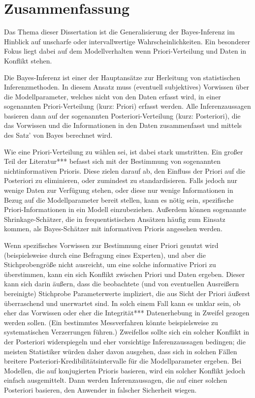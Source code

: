 \chapter*{Zusammenfassung}

Das Thema dieser Dissertation ist die Generalisierung der Bayes-Inferenz
im Hinblick auf unscharfe oder intervallwertige Wahrscheinlichkeiten.
Ein besonderer Fokus liegt dabei auf dem Modellverhalten
wenn Priori-Verteilung und Daten in Konflikt stehen.

Die Bayes-Inferenz ist einer der Hauptansätze zur Herleitung von statistischen Inferenzmethoden.
In diesem Ansatz muss (eventuell subjektives) Vorwissen über die Modellparameter,
welches nicht von den Daten erfasst wird, in einer sogenannten Priori-Verteilung (kurz: Priori) erfasst werden.
Alle Inferenzaussagen basieren dann auf der sogenannten Posteriori-Verteilung (kurz: Posteriori),
die das Vorwissen und die Informationen in den Daten zusammenfasst
und mittels des Satz' von Bayes berechnet wird.

Wie eine Priori-Verteilung zu wählen sei, ist dabei stark umstritten.
Ein großer Teil der Literatur*** befasst sich mit der Bestimmung von sogenannten
nichtinformativen Prioris. Diese zielen darauf ab, den Einfluss der Priori auf die Posteriori
zu eliminieren, oder zumindest zu standardisieren.
Falls jedoch nur wenige Daten zur Verfügung stehen, oder diese nur wenige Informationen
in Bezug auf die Modellparameter bereit stellen,
kann es nötig sein, spezifische Priori-Informationen in ein Modell einzubeziehen.
Außerdem können sogenannte Shrinkage-Schätzer, die in frequentistischen Ansätzen häufig zum Einsatz kommen,
als Bayes-Schätzer mit informativen Prioris angesehen werden.

Wenn spezifisches Vorwissen zur Bestimmung einer Priori genutzt wird (beispielsweise durch eine Befragung eines Experten),
und aber die Stichprobengröße nicht ausreicht, um eine solche informative Priori zu überstimmen,
kann ein sich Konflikt zwischen Priori und Daten ergeben.
Dieser kann sich darin äußern, dass die beobachtete (und von eventuellen Ausreißern bereinigte)
Stichprobe Parameterwerte impliziert, die aus Sicht der Priori äußerst überraschend und unerwartet sind.
In solch einem Fall kann es unklar sein, ob eher das Vorwissen oder eher die Integrität***
Datenerhebung in Zweifel gezogen werden sollen.
(Ein bestimmtes Messverfahren könnte beispielsweise zu systematischen Verzerrungen führen.)
Zweifellos sollte sich ein solcher Konflikt in der Posteriori widerspiegeln
und eher vorsichtige Inferenzaussagen bedingen;
die meisten Statistiker würden daher davon ausgehen,
dass sich in solchen Fällen breitere Posteriori-Kredibilitätsintervalle für die Modellparameter ergeben.
Bei Modellen, die auf konjugierten Prioris basieren,
wird ein solcher Konflikt jedoch einfach ausgemittelt.
Dann werden Inferenzaussagen, die auf einer solchen Posteriori basieren, den Anwender in falscher Sicherheit wiegen.

